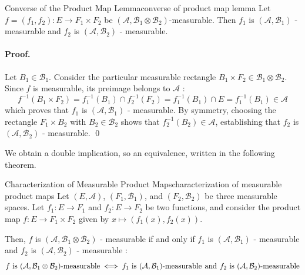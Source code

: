 \begin{proposition}{Converse of the Product Map Lemma}{converse of product map lemma}
Let $f = (f_1, f_2) : E \to F_1 \times F_2$ be $(\mathcal{A}, \mathcal{B}_1 \otimes \mathcal{B}_2)$-measurable. Then $f_1$ is $(\mathcal{A}, \mathcal{B}_1)$ - measurable and $f_2$ is $(\mathcal{A}, \mathcal{B}_2)$ - measurable.
\end{proposition}

\paragraph{Proof.}
Let $B_1 \in \mathcal{B}_1$. Consider the particular measurable rectangle $B_1 \times F_2 \in \mathcal{B}_1 \otimes \mathcal{B}_2$.
Since $f$ is measurable, its preimage belongs to $\mathcal{A}$ :
\[
    f^{-1}(B_1 \times F_2) = f_1^{-1}(B_1) \cap f_2^{-1}(F_2) = f_1^{-1}(B_1) \cap E = f_1^{-1}(B_1) \in \mathcal{A}
\]
which proves that $f_1$ is $(\mathcal{A}, \mathcal{B}_1)$ - measurable.
By symmetry, choosing the rectangle $F_1 \times B_2$ with $B_2 \in \mathcal{B}_2$ shows that $f_2^{-1}(B_2) \in \mathcal{A}$, establishing that $f_2$ is $(\mathcal{A}, \mathcal{B}_2)$ - measurable. \qed

\vspace{1.2em}

We obtain a double implication, so an equivalence, written in the following theorem.
\vspace{1.2em}


\begin{theorem}{Characterization of Measurable Product Maps}{characterization of measurable product maps}
Let $(E, \mathcal{A})$, $(F_1, \mathcal{B}_1)$, and $(F_2, \mathcal{B}_2)$ be three measurable spaces.
Let $f_1 : E \to F_1$ and $f_2 : E \to F_2$ be two functions, and consider the product map $f : E \to F_1 \times F_2$ given by $x \mapsto (f_1(x), f_2(x))$.

\vspace{0.5em}
Then, $f$ is $(\mathcal{A}, \mathcal{B}_1 \otimes \mathcal{B}_2)$ - measurable if and only if $f_1$ is $(\mathcal{A}, \mathcal{B}_1)$ - measurable and $f_2$ is $(\mathcal{A}, \mathcal{B}_2)$ - measurable :
\[
    f \text{ is } (\mathcal{A}, \mathcal{B}_1 \otimes \mathcal{B}_2)\text{-measurable} \iff f_1 \text{ is } (\mathcal{A}, \mathcal{B}_1)\text{-measurable} \hspace{0.4em} \text{and} \hspace{0.4em} f_2 \text{ is } (\mathcal{A}, \mathcal{B}_2)\text{-measurable}
\]
\end{theorem}

